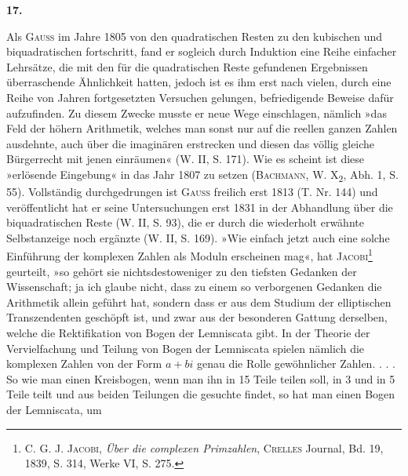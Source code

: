 \clearpage\begingroup{}
\renewcommand{\thefootnote}{\arabic{footnote})}\setcounter{footnote}{0}
\begin{center}
\textbf{17.}\par\smallskip
{}
\end{center}
\noindent\hspace*{\parindent}Als \textsc{Gauss} im Jahre 1805 von den quadratischen Resten zu den kubischen
und biquadratischen fortschritt, fand er sogleich durch Induktion eine Reihe
einfacher Lehrsätze, die mit den für die quadratischen Reste gefundenen Ergebnissen
überraschende Ähnlichkeit hatten, jedoch ist es ihm erst nach vielen,
durch eine Reihe von Jahren fortgesetzten Versuchen gelungen, befriedigende
Beweise dafür aufzufinden. Zu diesem Zwecke musste er neue Wege einschlagen,
nämlich »das Feld der höhern Arithmetik, welches man sonst nur
auf die reellen ganzen Zahlen ausdehnte, auch über die imaginären erstrecken
und diesen das völlig gleiche Bürgerrecht mit jenen einräumen« (W. II, S. 171).
Wie es scheint ist diese »erlösende Eingebung« in das Jahr 1807 zu setzen
(\textsc{Bachmann}, W. X\textsubscript{2}, Abh. 1, S. 55). Vollständig durchgedrungen ist \textsc{Gauss} freilich
erst 1813 (T. Nr. 144) und veröffentlicht hat er seine Untersuchungen erst 1831
in der Abhandlung über die biquadratischen Reste (W. II, S. 93), die er durch
die wiederholt erwähnte Selbstanzeige noch ergänzte (W. II, S. 169). »Wie
einfach jetzt auch eine solche Einführung der komplexen Zahlen als Moduln
erscheinen mag«, hat \textsc{Jacobi}\footnote{C. G. J. \textsc{Jacobi}, \textit{Über die complexen Primzahlen}, \textsc{Crelles} Journal, Bd. 19, 1839, S. 314, Werke VI, S. 275.} geurteilt, »so gehört sie nichtsdestoweniger zu
den tiefsten Gedanken der Wissenschaft; ja ich glaube nicht, dass zu einem
so verborgenen Gedanken die Arithmetik allein geführt hat, sondern dass er
aus dem Studium der elliptischen Transzendenten geschöpft ist, und zwar aus
der besonderen Gattung derselben, welche die Rektifikation von Bogen der
Lemniscata gibt. In der Theorie der Vervielfachung und Teilung von Bogen
der Lemniscata spielen nämlich die komplexen Zahlen von der Form \(a+bi\)
genau die Rolle gewöhnlicher Zahlen. . . . So wie man einen Kreisbogen,
wenn man ihn in 15 Teile teilen soll, in 3 und in 5 Teile teilt und aus beiden
\clearpage{}\setcounter{footnote}{0}
\noindent Teilungen die gesuchte findet, so hat man einen Bogen der Lemniscata, um
